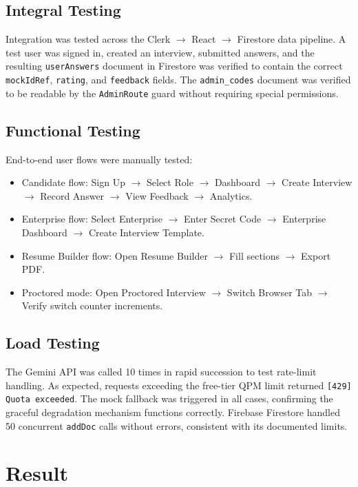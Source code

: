 \section{Integral Testing}
Integration was tested across the Clerk $\rightarrow$ React $\rightarrow$ Firestore data pipeline. A test user was signed in, created an interview, submitted answers, and the resulting \texttt{userAnswers} document in Firestore was verified to contain the correct \texttt{mockIdRef}, \texttt{rating}, and \texttt{feedback} fields. The \texttt{admin\_codes} document was verified to be readable by the \texttt{AdminRoute} guard without requiring special permissions.

\section{Functional Testing}
End-to-end user flows were manually tested:
\begin{itemize}
	\item Candidate flow: Sign Up $\rightarrow$ Select Role $\rightarrow$ Dashboard $\rightarrow$ Create Interview $\rightarrow$ Record Answer $\rightarrow$ View Feedback $\rightarrow$ Analytics.
	\item Enterprise flow: Select Enterprise $\rightarrow$ Enter Secret Code $\rightarrow$ Enterprise Dashboard $\rightarrow$ Create Interview Template.
	\item Resume Builder flow: Open Resume Builder $\rightarrow$ Fill sections $\rightarrow$ Export PDF.
	\item Proctored mode: Open Proctored Interview $\rightarrow$ Switch Browser Tab $\rightarrow$ Verify switch counter increments.
\end{itemize}

\section{Load Testing}
The Gemini API was called 10 times in rapid succession to test rate-limit handling. As expected, requests exceeding the free-tier QPM limit returned \texttt{[429] Quota exceeded}. The mock fallback was triggered in all cases, confirming the graceful degradation mechanism functions correctly. Firebase Firestore handled 50 concurrent \texttt{addDoc} calls without errors, consistent with its documented limits.

\chapter{Result}

